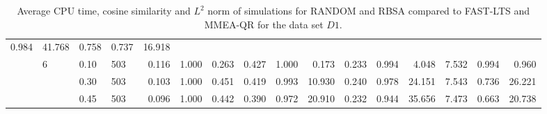 \documentclass[thesis=B,english]{FITthesis}[2012/10/20]
\begin{document}
\begin{table}[h!]
\begin{adjustbox}{angle=90}
{\begin{tabular}{ll|l|l|r|r|r|r|r|r|r|r|r|r|r|r|}
 0.984 &  41.768 &  0.758 &  0.737 &  16.918 \\     & 6 & 0.10 & 503 &    0.116 &  1.000 &  0.263 &   0.427 &  1.000 &   0.173 &  0.233 &  0.994 &   4.048 &  7.532 &  0.994 &   0.960 \\     &   & 0.30 & 503 &    0.103 &  1.000 &  0.451 &   0.419 &  0.993 &  10.930 &  0.240 &  0.978 &  24.151 &  7.543 &  0.736 &  26.221 \\     &   & 0.45 & 503 &    0.096 &  1.000 &  0.442 &   0.390 &  0.972 &  20.910 &  0.232 &  0.944 &  35.656 &  7.473 &  0.663 &  20.738 \\
                         
                 \hline
                \end{tabular}
			}
			
\end{adjustbox}
    
    \caption{Average CPU time, cosine similarity and $L^2$ norm of simulations for RANDOM and RBSA  compared to FAST-LTS and MMEA-QR for the data set $D1$.}
    \label{table:randim:1}
\end{table}
\end{document}
